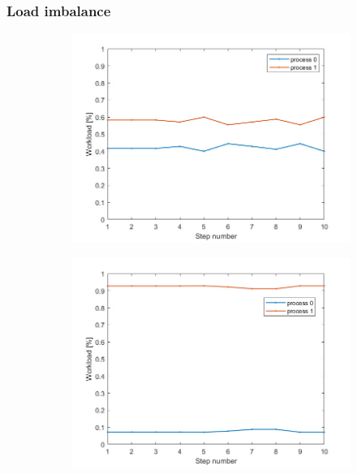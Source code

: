 \documentclass{beamer}
\begin{document}
\begin{frame} %
	\frametitle{Load imbalance}
	\begin{figure}
		\begin{subfigure}{.333\textwidth}
			\vspace{-6pt}
			\includegraphics[width=\linewidth]{etc/test4_1.jpeg}
		\end{subfigure}%
		\begin{subfigure}{.333\textwidth}
			\includegraphics[width=\linewidth]{etc/test5_1.jpeg}

\end{subfigure}
\end{figure}
\end{frame}
\end{document}
